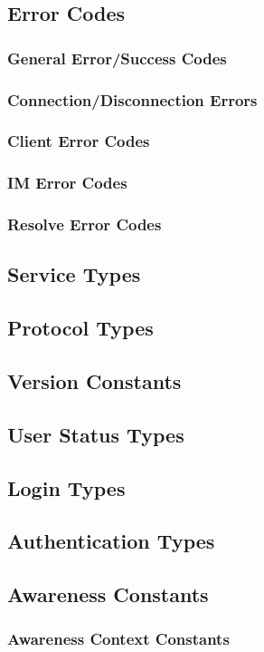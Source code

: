 \documentclass[titlepage,oneside]{book}
\begin{document}
\subsection{Error Codes}
\subsubsection{General Error/Success Codes}
\subsubsection{Connection/Disconnection Errors}
\subsubsection{Client Error Codes}
\subsubsection{IM Error Codes}
\subsubsection{Resolve Error Codes}

\subsection{Service Types}
\subsection{Protocol Types}
\subsection{Version Constants}
\subsection{User Status Types}
\subsection{Login Types}
\subsection{Authentication Types}
\subsection{Awareness Constants}
\subsubsection{Awareness Context Constants}
\end{document}
